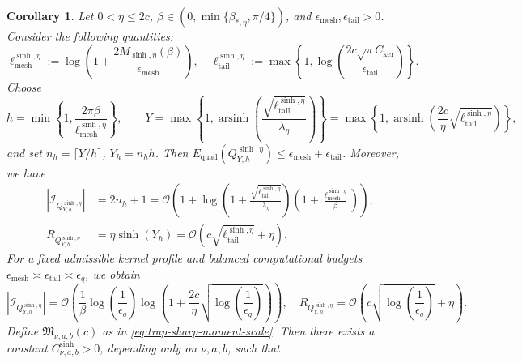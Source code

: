\documentclass[10pt,reqno]{article}
\numberwithin{equation}{section}
\theoremstyle{plain}
\newtheorem{cor}[thm]{Corollary}
\theoremstyle{definition}
\begin{document}
\begin{cor}\label{sinh-budget}
Let \(0<\eta\le 2c\), \(\beta\in(0,\min\{\beta_{\ast,\eta},\pi/4\})\), and \(\epsilon_{\operatorname{mesh}},\epsilon_{\operatorname{tail}}>0\). Consider the following quantities:
\begin{equation}\label{eq:sinh-logs-def}
\ell_{\operatorname{mesh}}^{\operatorname{sinh},\eta} := \log\left(1+\frac{2M_{\operatorname{sinh},\eta}(\beta)}{\epsilon_{\operatorname{mesh}}}\right), \quad \ell_{\operatorname{tail}}^{\operatorname{sinh},\eta} := \max\left\{1,\log\left(\frac{2c\sqrt{\pi}C_{\operatorname{ker}}}{\epsilon_{\operatorname{tail}}}\right)\right\}.
\end{equation}
Choose
\[
h = \min\left\{1,\frac{2\pi\beta}{\ell_{\operatorname{mesh}}^{\operatorname{sinh},\eta}}\right\}, \qquad Y = \max\left\{1,\operatorname{arsinh}\left(\frac{\sqrt{\ell_{\operatorname{tail}}^{\operatorname{sinh},\eta}}}{\lambda_\eta}\right)\right\} = \max\left\{1,\operatorname{arsinh}\left(\frac{2c}{\eta}\sqrt{\ell_{\operatorname{tail}}^{\operatorname{sinh},\eta}}\right)\right\},
\]
and set \(n_h=\lceil Y/h\rceil\), \(Y_h=n_hh\). Then \(E_{\operatorname{quad}}(Q_{Y,h}^{\operatorname{sinh},\eta}) \le \epsilon_{\operatorname{mesh}}+\epsilon_{\operatorname{tail}}\). Moreover, we have
\begin{align}
|\mathcal I_{Q_{Y,h}^{\operatorname{sinh},\eta}}| &= 2n_h+1 = \mathcal O\left(1+\log\left(1+\frac{\sqrt{\ell_{\operatorname{tail}}^{\operatorname{sinh},\eta}}}{\lambda_\eta}\right)\left(1+\frac{\ell_{\operatorname{mesh}}^{\operatorname{sinh},\eta}}{\beta}\right)\right), \label{eq:sinh-cardinality-bound}\\
R_{Q_{Y,h}^{\operatorname{sinh},\eta}} &= \eta\sinh(Y_h) = \mathcal O\left(c\sqrt{\ell_{\operatorname{tail}}^{\operatorname{sinh},\eta}}+\eta\right). \label{eq:sinh-radius-bound}
\end{align}
For a fixed admissible kernel profile and balanced computational budgets \(\epsilon_{\operatorname{mesh}}\asymp \epsilon_{\operatorname{tail}}\asymp\epsilon_q\), we obtain
\begin{equation}\label{eq:sinh-balanced-cardinality-radius}
|\mathcal I_{Q_{Y,h}^{\operatorname{sinh},\eta}}| = \mathcal O\left(\frac{1}{\beta}\log\left(\frac1{\epsilon_q}\right)\log\left(1+\frac{2c}{\eta}\sqrt{\log\left(\frac1{\epsilon_q}\right)}\right)\right), \quad R_{Q_{Y,h}^{\operatorname{sinh},\eta}} = \mathcal O\left(c\sqrt{\log\left(\frac1{\epsilon_q}\right)}+\eta\right).
\end{equation}
Define \(\mathfrak M_{\nu,a,b}(c)\) as in \cref{eq:trap-sharp-moment-scale}. Then there exists a constant \(C_{\nu,a,b}^{\operatorname{sinh}}>0\), depending only on \(\nu,a,b\), such that

\end{cor}
\end{document}
